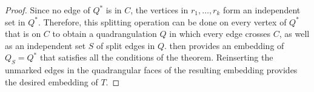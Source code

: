 \documentclass{patmorin}
\begin{document}
\begin{proof}
   Since no edge of $Q^*$ is in $C$, the vertices in $r_1,\ldots,r_k$ form
   an independent set in $Q^*$.  Therefore, this splitting operation
   can be done on every vertex of $Q^*$ that is on $C$ to obtain a
   quadrangulation $Q$ in which every edge crosses $C$, as well
   as an independent set $S$ of split edges in $Q$.   then
   provides an embedding of $Q_S=Q^*$ that satisfies all the conditions of
   the theorem.  Reinserting the unmarked edges in the quadrangular
   faces of the resulting embedding provides the desired embedding of $T$.
%
%
%
%
%
%
%

\end{proof}
\end{document}

